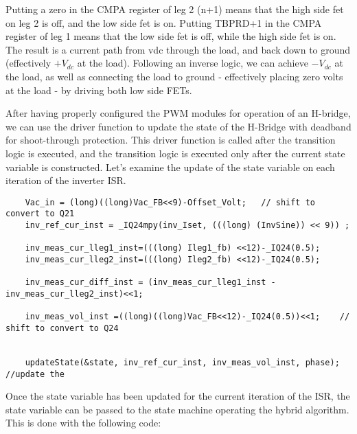 Putting a zero in the CMPA register of leg 2 (n+1) means that the high side fet on leg 2 is off, and the low side fet is on.
Putting TBPRD+1 in the CMPA register of  leg 1 means that the low side fet is off, while the high side fet is on. 
The result is a current path from vdc through the load, and back down to ground (effectively $+V_{dc}$ at the load). Following an inverse logic, we can achieve $-V_{dc}$ at the load, as well as connecting the load to ground - effectively placing zero volts at the load - by driving both low side FETs.

After having properly configured the PWM modules for operation of an H-bridge, we can use the driver function to update the state of the H-Bridge with deadband for shoot-through protection. This driver function is called after the transition logic is executed, and the transition logic is executed only after the current state variable is constructed. Let's examine the update of the state variable on each iteration of the inverter ISR. 

\begin{lstlisting}
	Vac_in = (long)((long)Vac_FB<<9)-Offset_Volt;	// shift to convert to Q21
	inv_ref_cur_inst = _IQ24mpy(inv_Iset, (((long) (InvSine)) << 9)) ;

	inv_meas_cur_lleg1_inst=(((long) Ileg1_fb) <<12)-_IQ24(0.5);
	inv_meas_cur_lleg2_inst=(((long) Ileg2_fb) <<12)-_IQ24(0.5);

	inv_meas_cur_diff_inst = (inv_meas_cur_lleg1_inst - inv_meas_cur_lleg2_inst)<<1;

	inv_meas_vol_inst =((long)((long)Vac_FB<<12)-_IQ24(0.5))<<1;	// shift to convert to Q24


	updateState(&state, inv_ref_cur_inst, inv_meas_vol_inst, phase);		//update the
\end{lstlisting}
 
Once the state variable has been updated for the current iteration of the ISR, the state variable can be passed to the state machine operating the hybrid algorithm. This is done with the following code:

